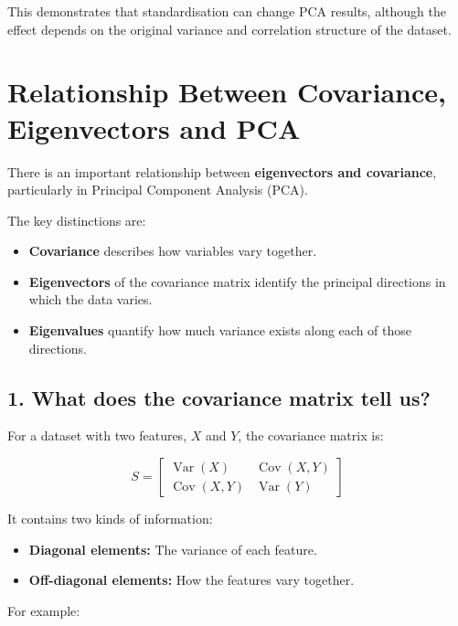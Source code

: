 \documentclass[11pt]{article}
\providecommand{\tightlist}{%
      \setlength{\itemsep}{0pt}\setlength{\parskip}{0pt}}
\begin{document}
This demonstrates that standardisation can change PCA results, although
the effect depends on the original variance and correlation structure of
the dataset.



    \section{Relationship Between Covariance, Eigenvectors and
PCA}\label{relationship-between-covariance-eigenvectors-and-pca}

There is an important relationship between \textbf{eigenvectors and
covariance}, particularly in Principal Component Analysis (PCA).

The key distinctions are:

\begin{itemize}
\tightlist
\item
  \textbf{Covariance} describes how variables vary together.
\item
  \textbf{Eigenvectors} of the covariance matrix identify the principal
  directions in which the data varies.
\item
  \textbf{Eigenvalues} quantify how much variance exists along each of
  those directions.
\end{itemize}

\subsection{1. What does the covariance matrix tell
us?}\label{what-does-the-covariance-matrix-tell-us}

For a dataset with two features, \(X\) and \(Y\), the covariance matrix
is:

\[
S =
\begin{bmatrix}
\operatorname{Var}(X) & \operatorname{Cov}(X,Y) \\
\operatorname{Cov}(X,Y) & \operatorname{Var}(Y)
\end{bmatrix}
\]

It contains two kinds of information:

\begin{itemize}
\tightlist
\item
  \textbf{Diagonal elements:} The variance of each feature.
\item
  \textbf{Off-diagonal elements:} How the features vary together.
\end{itemize}

For example:
\end{document}
